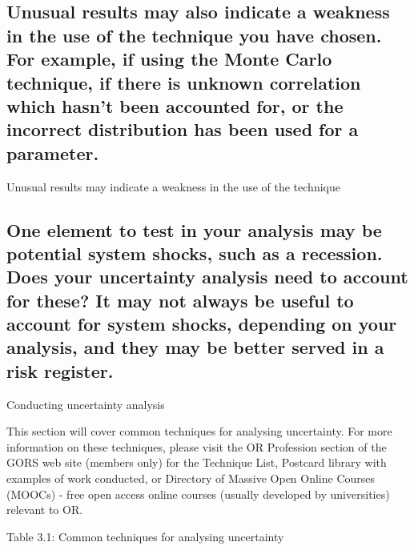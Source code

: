 \documentclass[]{book}
\begin{document}
\subsection{Unusual results may also indicate a weakness in the use of
the technique you have chosen. For example, if using the Monte Carlo
technique, if there is unknown correlation which hasn't been accounted
for, or the incorrect distribution has been used for a
parameter.}\label{unusual-results-may-also-indicate-a-weakness-in-the-use-of-the-technique-you-have-chosen.-for-example-if-using-the-monte-carlo-technique-if-there-is-unknown-correlation-which-hasnt-been-accounted-for-or-the-incorrect-distribution-has-been-used-for-a-parameter.}

 Unusual results may indicate a weakness in the use of the technique

\subsection{One element to test in your analysis may be potential system
shocks, such as a recession. Does your uncertainty analysis need to
account for these? It may not always be useful to account for system
shocks, depending on your analysis, and they may be better served in a
risk
register.}\label{one-element-to-test-in-your-analysis-may-be-potential-system-shocks-such-as-a-recession.-does-your-uncertainty-analysis-need-to-account-for-these-it-may-not-always-be-useful-to-account-for-system-shocks-depending-on-your-analysis-and-they-may-be-better-served-in-a-risk-register.}

Conducting uncertainty analysis

 This section will cover common techniques for analysing uncertainty.
For more information on these techniques, please visit the OR Profession
section of the GORS web site (members only) for the Technique List,
Postcard library with examples of work conducted, or Directory of
Massive Open Online Courses (MOOCs) - free open access online courses
(usually developed by universities) relevant to OR.

Table 3.1: Common techniques for analysing uncertainty
\end{document}

